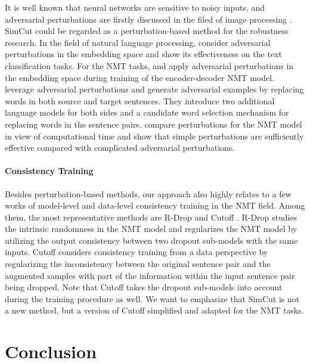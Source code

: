 \documentclass[11pt]{article}
\begin{document}
It is well known that neural networks are sensitive to noisy inputs, and adversarial perturbations are firstly discussed in the filed of image processing \cite{szegedy2013intriguing, goodfellow2014explaining}. SimCut could be regarded as a perturbation-based method for the robustness research. In the field of natural language processing, \citet{miyato2016adversarial} consider adversarial perturbations in the embedding space and show its effectiveness on the text classification tasks. For the NMT tasks, \citet{sano2019effective} and \citet{wang2019improving} apply adversarial perturbations in the embedding space during training of the encoder-decoder NMT model. \citet{cheng2019robust} leverage adversarial perturbations and generate adversarial examples by replacing words in both source and target sentences. They introduce two additional language models for both sides and a candidate word selection mechanism for replacing words in the sentence pairs. \citet{takase2021rethinking} compare perturbations for the NMT model in view of computational time and show that simple perturbations are sufficiently effective compared with complicated adversarial perturbations.

\paragraph{Consistency Training}

Besides perturbation-based methods, our approach also highly relates to a few works of model-level and data-level consistency training in the NMT field. Among them, the most representative methods are R-Drop \cite{liang2021r} and Cutoff \cite{shen2020simple}. R-Drop studies the intrinsic randomness in the NMT model and regularizes the NMT model by utilizing the output consistency between two dropout sub-models with the same inputs. Cutoff considers consistency training from a data perspective by regularizing the inconsistency between the original sentence pair and the augmented samples with part of the information within the input sentence pair being dropped. Note that Cutoff takes the dropout sub-models into account during the training procedure as well. We want to emphasize that SimCut is not a new method, but a version of Cutoff simplified and adapted for the NMT tasks.


\section{Conclusion}
\end{document}
